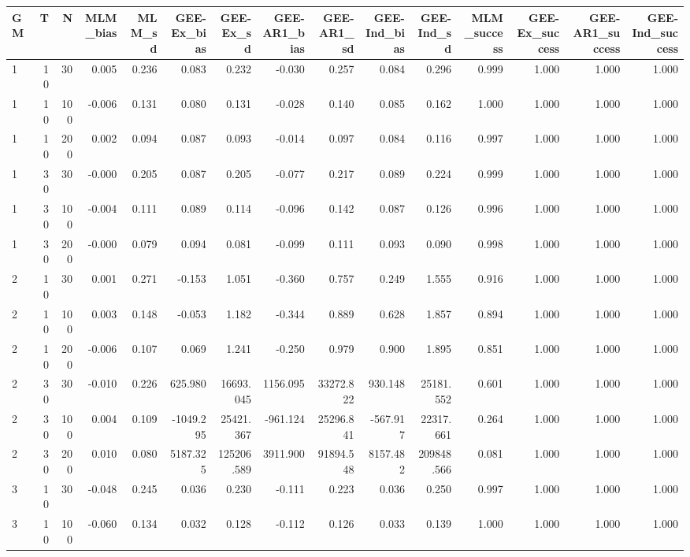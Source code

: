 \begin{table}[ht]
\centering
\begin{tabular}{lrrrrrrrrrrrrrr}
  \hline
GM & T & N & MLM\_bias & MLM\_sd & GEE-Ex\_bias & GEE-Ex\_sd & GEE-AR1\_bias & GEE-AR1\_sd & GEE-Ind\_bias & GEE-Ind\_sd & MLM\_success & GEE-Ex\_success & GEE-AR1\_success & GEE-Ind\_success \\ 
  \hline
1 & 10 & 30 & 0.005 & 0.236 & 0.083 & 0.232 & -0.030 & 0.257 & 0.084 & 0.296 & 0.999 & 1.000 & 1.000 & 1.000 \\ 
  1 & 10 & 100 & -0.006 & 0.131 & 0.080 & 0.131 & -0.028 & 0.140 & 0.085 & 0.162 & 1.000 & 1.000 & 1.000 & 1.000 \\ 
  1 & 10 & 200 & 0.002 & 0.094 & 0.087 & 0.093 & -0.014 & 0.097 & 0.084 & 0.116 & 0.997 & 1.000 & 1.000 & 1.000 \\ 
  1 & 30 & 30 & -0.000 & 0.205 & 0.087 & 0.205 & -0.077 & 0.217 & 0.089 & 0.224 & 0.999 & 1.000 & 1.000 & 1.000 \\ 
  1 & 30 & 100 & -0.004 & 0.111 & 0.089 & 0.114 & -0.096 & 0.142 & 0.087 & 0.126 & 0.996 & 1.000 & 1.000 & 1.000 \\ 
  1 & 30 & 200 & -0.000 & 0.079 & 0.094 & 0.081 & -0.099 & 0.111 & 0.093 & 0.090 & 0.998 & 1.000 & 1.000 & 1.000 \\ 
  2 & 10 & 30 & 0.001 & 0.271 & -0.153 & 1.051 & -0.360 & 0.757 & 0.249 & 1.555 & 0.916 & 1.000 & 1.000 & 1.000 \\ 
  2 & 10 & 100 & 0.003 & 0.148 & -0.053 & 1.182 & -0.344 & 0.889 & 0.628 & 1.857 & 0.894 & 1.000 & 1.000 & 1.000 \\ 
  2 & 10 & 200 & -0.006 & 0.107 & 0.069 & 1.241 & -0.250 & 0.979 & 0.900 & 1.895 & 0.851 & 1.000 & 1.000 & 1.000 \\ 
  2 & 30 & 30 & -0.010 & 0.226 & 625.980 & 16693.045 & 1156.095 & 33272.822 & 930.148 & 25181.552 & 0.601 & 1.000 & 1.000 & 1.000 \\ 
  2 & 30 & 100 & 0.004 & 0.109 & -1049.295 & 25421.367 & -961.124 & 25296.841 & -567.917 & 22317.661 & 0.264 & 1.000 & 1.000 & 1.000 \\ 
  2 & 30 & 200 & 0.010 & 0.080 & 5187.325 & 125206.589 & 3911.900 & 91894.548 & 8157.482 & 209848.566 & 0.081 & 1.000 & 1.000 & 1.000 \\ 
  3 & 10 & 30 & -0.048 & 0.245 & 0.036 & 0.230 & -0.111 & 0.223 & 0.036 & 0.250 & 0.997 & 1.000 & 1.000 & 1.000 \\ 
  3 & 10 & 100 & -0.060 & 0.134 & 0.032 & 0.128 & -0.112 & 0.126 & 0.033 & 0.139 & 1.000 & 1.000 & 1.000 & 1.000 \\ 

\end{tabular}
\end{table}
